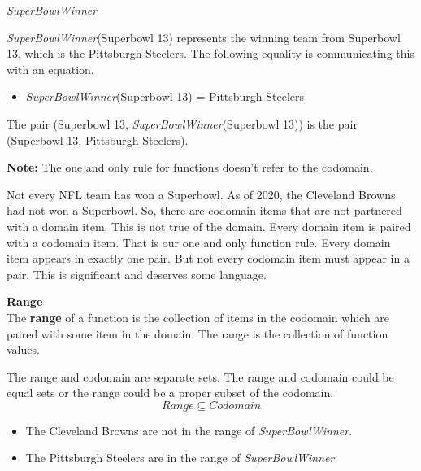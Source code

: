 \documentclass{ximera}
\begin{document}
\begin{example} \textit{SuperBowlWinner}


\textit{SuperBowlWinner}(Superbowl 13) represents the winning team from Superbowl 13, which is the Pittsburgh Steelers.  The following equality is communicating this with an equation.

\begin{itemize}
\item \textit{SuperBowlWinner}(Superbowl 13) = Pittsburgh Steelers  
\end{itemize}



The pair (Superbowl 13, \textit{SuperBowlWinner}(Superbowl 13)) is the pair (Superbowl 13, Pittsburgh Steelers). \

\end{example}

\textbf{Note:} The one and only rule for functions doesn't refer to the codomain.

Not every NFL team has won a Superbowl. As of 2020, the Cleveland Browns had not won a Superbowl.  So, there are codomain items that are not partnered with a domain item.  This is not true of the domain.  Every domain item is paired with a codomain item.  That is our one and only function rule.  Every domain item appears in exactly one pair.  But not every codomain item must appear in a pair.  This is significant and deserves some language.


\begin{definition} \textbf{\textcolor{green!50!black}{Range}} \\

The \textbf{range} of a function is the collection of items in the codomain which are paired with some item in the domain.  The range is the collection of function values.
\end{definition}

The range and codomain are separate sets.  The range and codomain could be equal sets or the range could be a proper subset of the codomain. \\

\[  Range \subseteq Codomain\]

\begin{itemize}
\item The Cleveland Browns are not in the range of \textit{SuperBowlWinner}.  
\item The Pittsburgh Steelers are in the range of \textit{SuperBowlWinner}.
\end{itemize}
\end{document}
